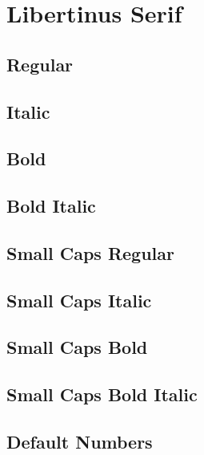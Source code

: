 \documentclass{article}
\begin{document}
\begin{center}\huge
{\LibertinusDisplay{}}
\end{center}

\tableofcontents

\section{Libertinus Serif}


\subsection*{Regular}
\lipsum[1]

\subsection*{Italic}
\textit{\lipsum[2]} 

\subsection*{Bold}
\textbf{\lipsum[3]}

\subsection*{Bold Italic}

\textbf{\textit{\lipsum[4]}}


\subsection*{Small Caps Regular}
\textsc{\lipsum[5]}

\subsection*{Small Caps Italic}
\textsc{\textit{\lipsum[6]}}

\subsection*{Small Caps Bold}
\textsc{\textbf{\lipsum[7]}}

\subsection*{Small Caps Bold Italic}

\textsc{\textbf{\textit{\lipsum[8]}}}

\subsection*{Default Numbers}
\end{document}
